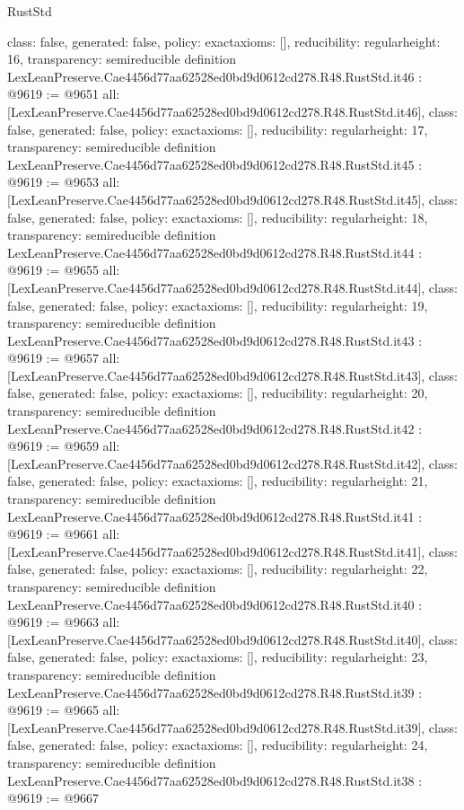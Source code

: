 \begin{lexlean}{RustStd}
\begin{coremodule}
{  class: false,
  generated: false,
  policy: exact{axioms: []},
  reducibility: regular{height: 16},
  transparency: semireducible
}
definition LexLeanPreserve.Cae4456d77aa62528ed0bd9d0612cd278.R48.RustStd.it46 : @9619 := @9651 {
  all: [LexLeanPreserve.Cae4456d77aa62528ed0bd9d0612cd278.R48.RustStd.it46],
  class: false,
  generated: false,
  policy: exact{axioms: []},
  reducibility: regular{height: 17},
  transparency: semireducible
}
definition LexLeanPreserve.Cae4456d77aa62528ed0bd9d0612cd278.R48.RustStd.it45 : @9619 := @9653 {
  all: [LexLeanPreserve.Cae4456d77aa62528ed0bd9d0612cd278.R48.RustStd.it45],
  class: false,
  generated: false,
  policy: exact{axioms: []},
  reducibility: regular{height: 18},
  transparency: semireducible
}
definition LexLeanPreserve.Cae4456d77aa62528ed0bd9d0612cd278.R48.RustStd.it44 : @9619 := @9655 {
  all: [LexLeanPreserve.Cae4456d77aa62528ed0bd9d0612cd278.R48.RustStd.it44],
  class: false,
  generated: false,
  policy: exact{axioms: []},
  reducibility: regular{height: 19},
  transparency: semireducible
}
definition LexLeanPreserve.Cae4456d77aa62528ed0bd9d0612cd278.R48.RustStd.it43 : @9619 := @9657 {
  all: [LexLeanPreserve.Cae4456d77aa62528ed0bd9d0612cd278.R48.RustStd.it43],
  class: false,
  generated: false,
  policy: exact{axioms: []},
  reducibility: regular{height: 20},
  transparency: semireducible
}
definition LexLeanPreserve.Cae4456d77aa62528ed0bd9d0612cd278.R48.RustStd.it42 : @9619 := @9659 {
  all: [LexLeanPreserve.Cae4456d77aa62528ed0bd9d0612cd278.R48.RustStd.it42],
  class: false,
  generated: false,
  policy: exact{axioms: []},
  reducibility: regular{height: 21},
  transparency: semireducible
}
definition LexLeanPreserve.Cae4456d77aa62528ed0bd9d0612cd278.R48.RustStd.it41 : @9619 := @9661 {
  all: [LexLeanPreserve.Cae4456d77aa62528ed0bd9d0612cd278.R48.RustStd.it41],
  class: false,
  generated: false,
  policy: exact{axioms: []},
  reducibility: regular{height: 22},
  transparency: semireducible
}
definition LexLeanPreserve.Cae4456d77aa62528ed0bd9d0612cd278.R48.RustStd.it40 : @9619 := @9663 {
  all: [LexLeanPreserve.Cae4456d77aa62528ed0bd9d0612cd278.R48.RustStd.it40],
  class: false,
  generated: false,
  policy: exact{axioms: []},
  reducibility: regular{height: 23},
  transparency: semireducible
}
definition LexLeanPreserve.Cae4456d77aa62528ed0bd9d0612cd278.R48.RustStd.it39 : @9619 := @9665 {
  all: [LexLeanPreserve.Cae4456d77aa62528ed0bd9d0612cd278.R48.RustStd.it39],
  class: false,
  generated: false,
  policy: exact{axioms: []},
  reducibility: regular{height: 24},
  transparency: semireducible
}
definition LexLeanPreserve.Cae4456d77aa62528ed0bd9d0612cd278.R48.RustStd.it38 : @9619 := @9667 {
}
\end{coremodule}
\end{lexlean}
